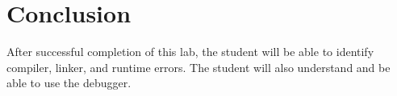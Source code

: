 \section{Conclusion}

After successful completion of this lab, the student will be able to identify compiler, linker, and runtime errors. The student will also understand and be able to use the debugger.
